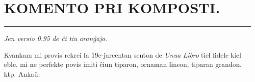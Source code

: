 \documentclass[12pt,twoside]{book}
\newcommand{\laversio}{0.95}
\begin{document}
\sectionline

%


%
\fancyhead[C]{--- \thepage ---}
\titleformat{\chapter}[display]{\centering\sansfont}{\chaptertitlename}{0pt}{\large}
\chapter*{KOMENTO PRI KOMPOSTI.}

\begin{center}
\rule[0.5ex]{0.5\textwidth}{0.4pt}

\emph{\hfil Jen versio \laversio{} de ĉi tiu} \XeLaTeX{} \emph{aranĝaĵo.}
\end{center}

\small Kvankam mi provis rekrei la 19e-jarcentan \glqq senton\grqq{} de \emph{Unua Libro} tiel fidele kiel eble, mi ne perfekte povis imiti ĉiun tiparon, ornaman lineon, tiparan grandon, ktp.  Ankaŭ:
\end{document}
